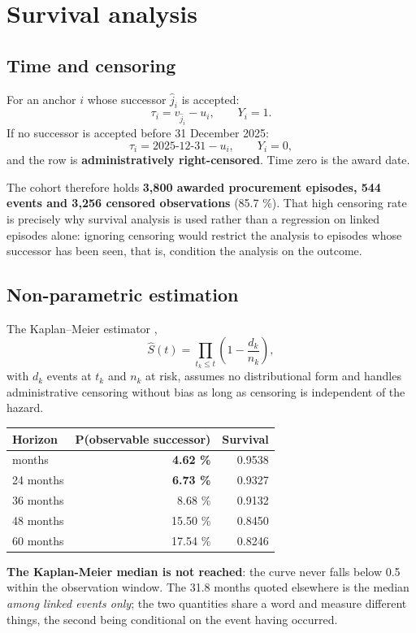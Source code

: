 \section{Survival analysis}

\subsection{Time and censoring}

For an anchor \(i\) whose successor \(\hat{j}_i\) is accepted:
\[\tau_i = v_{\hat{j}_i} - u_i, \qquad Y_i = 1.\]
If no successor is accepted before 31 December 2025:
\[\tau_i = \text{2025-12-31} - u_i, \qquad Y_i = 0,\]
and the row is \textbf{administratively right-censored}. Time zero is the award date.

The cohort therefore holds \textbf{3,800 awarded procurement episodes, 544 events and 3,256 censored observations} (85.7 \%). That high censoring rate is precisely why survival analysis is used rather than a regression on linked episodes alone: ignoring censoring would restrict the analysis to episodes whose successor has been seen, that is, condition the analysis on the outcome.

\subsection{Non-parametric estimation}

The Kaplan--Meier estimator \citep{kaplan1958},
\[\hat S(t) = \prod_{t_k \le t}\left(1 - \frac{d_k}{n_k}\right),\]
with \(d_k\) events at \(t_k\) and \(n_k\) at risk, assumes no distributional form and handles administrative censoring without bias as long as censoring is independent of the hazard.

\begingroup\footnotesize
\begin{longtable}[]{@{}lrr@{}}
\toprule\noalign{}
Horizon & P(observable successor) & Survival \\
\midrule\noalign{}
\endhead
\bottomrule\noalign{}
\endlastfoot
12 months & \textbf{4.62 \%} & 0.9538 \\
24 months & \textbf{6.73 \%} & 0.9327 \\
36 months & 8.68 \% & 0.9132 \\
48 months & 15.50 \% & 0.8450 \\
60 months & 17.54 \% & 0.8246 \\
\end{longtable}
\endgroup

\textbf{The Kaplan-Meier median is not reached}: the curve never falls below 0.5 within the observation window. The 31.8 months quoted elsewhere is the median \emph{among linked events only}; the two quantities share a word and measure different things, the second being conditional on the event having occurred.

